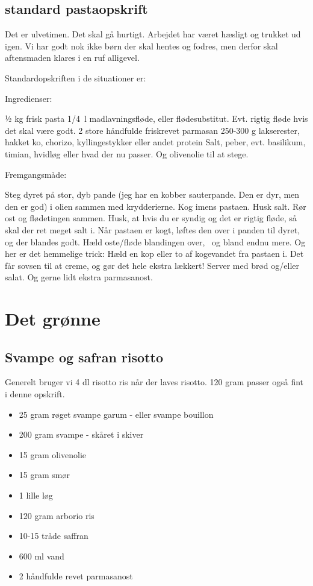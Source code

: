 \documentclass[
]{book}
\providecommand{\tightlist}{%
  \setlength{\itemsep}{0pt}\setlength{\parskip}{0pt}}
\begin{document}
\hypertarget{standard-pastaopskrift}{%
\section{standard pastaopskrift}\label{standard-pastaopskrift}}

Det er ulvetimen. Det skal gå hurtigt. Arbejdet har været hæsligt og trukket ud igen. Vi har godt nok ikke børn der skal hentes og fodres, men derfor skal aftensmaden klares i en ruf alligevel.

Standardopskriften i de situationer er:

Ingredienser:

½ kg frisk pasta
1/4~l madlavningsfløde, eller flødesubstitut. Evt. rigtig fløde hvis det skal være godt.
2 store håndfulde friskrevet parmasan
250-300 g lakserester, hakket ko, chorizo, kyllingestykker eller andet protein
Salt, peber, evt. basilikum, timian, hvidløg eller hvad der nu passer. Og olivenolie til at stege.

Fremgangsmåde:

Steg dyret på stor, dyb pande (jeg har en kobber sauterpande. Den er dyr, men den er god) i olien sammen med krydderierne.
Kog imens pastaen. Husk salt.
Rør ost og flødetingen sammen. Husk, at hvis du er syndig og det er rigtig fløde, så skal der ret meget salt i.
Når pastaen er kogt, løftes den over i panden til dyret, og der blandes godt. Hæld oste/fløde blandingen over, ~og bland endnu mere.
Og her er det hemmelige trick: Hæld en kop eller to af kogevandet fra pastaen i. Det får sovsen til at creme, og gør det hele ekstra lækkert!
Server med brød og/eller salat. Og gerne lidt ekstra parmasanost.

\hypertarget{det-gruxf8nne}{%
\chapter{Det grønne}\label{det-gruxf8nne}}

\hypertarget{svampe-og-safran-risotto}{%
\section{Svampe og safran risotto}\label{svampe-og-safran-risotto}}

Generelt bruger vi 4 dl risotto ris når der laves risotto.
120 gram passer også fint i denne opskrift.

\begin{itemize}
\tightlist
\item
  25 gram røget svampe garum - eller svampe bouillon
\item
  200 gram svampe - skåret i skiver
\item
  15 gram olivenolie
\item
  15 gram smør
\item
  1 lille løg
\item
  120 gram arborio ris
\item
  10-15 tråde saffran
\item
  600 ml vand
\item
  2 håndfulde revet parmasanost
\end{itemize}
\end{document}
